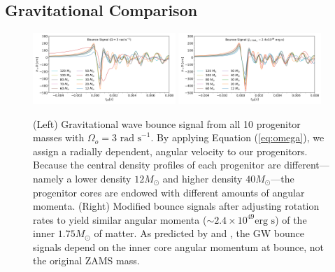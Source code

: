 \documentclass[twocolumn,times]{aastex62}  %
\begin{document}
\subsection{Gravitational Comparison}


\begin{figure}[t]
  \centering     %
  \includegraphics[width=0.48\textwidth]{figures/hd3_bounce_final.png}
  \includegraphics[width=0.48\textwidth]{figures/hdj_bounce_final.png}
  \caption{(Left) Gravitational wave bounce signal from all 10 progenitor masses with $\Omega_o = 3 \text{ rad s}^{-1}$.  By applying Equation (\ref{eq:omega}), we assign a radially dependent, angular velocity to our progenitors.  Because the central density profiles of each progenitor are different---namely a lower density $12 M_\odot$ and higher density $40 M_\odot$---the progenitor cores are endowed with different amounts of angular momenta.   (Right) Modified bounce signals after adjusting rotation rates to yield similar angular momenta ($\sim 2.4\times10^{49} \text{erg s}$) of the inner $1.75 M_\odot$ of matter.  As predicted by \citet{dimm:2008} and \citet{abdik:2010,abdik:2014}, the GW bounce signals depend on the inner core angular momentum at bounce, not the original ZAMS mass.}
  \label{fig:bounce}
\end{figure}
\end{document}
